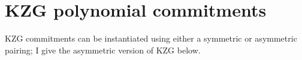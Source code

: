


\section{KZG polynomial commitments}\label{sec:kzg}

KZG commitments can be instantiated using either a symmetric or asymmetric pairing; I give the asymmetric version of KZG below.

